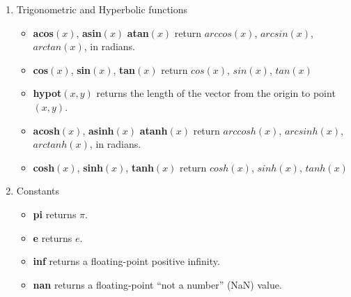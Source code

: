 \begin{enumerate}
\item Trigonometric and Hyperbolic functions
\begin{itemize}
\item \textbf{acos}$(x)$, \textbf{asin}$(x)$ \textbf{atan}$(x)$ return $arccos(x)$, $arcsin(x)$, $arctan(x)$, in radians.
\item \textbf{cos}$(x)$, \textbf{sin}$(x)$, \textbf{tan}$(x)$ return $cos(x)$, $sin(x)$, $tan(x)$
\item \textbf{hypot}$(x,y)$ returns the length of the vector from the origin to point $(x, y)$.
\item \textbf{acosh}$(x)$, \textbf{asinh}$(x)$ \textbf{atanh}$(x)$ return $arccosh(x)$, $arcsinh(x)$, $arctanh(x)$, in radians.
\item \textbf{cosh}$(x)$, \textbf{sinh}$(x)$, \textbf{tanh}$(x)$ return $cosh(x)$, $sinh(x)$, $tanh(x)$
\end{itemize}

\item Constants
\begin{itemize}
\item \textbf{pi} returns $\pi$.
\item \textbf{e} returns $e$.
\item \textbf{inf} returns a floating-point positive infinity.
\item \textbf{nan} returns a floating-point “not a number” (NaN) value.
\end{itemize}
\end{enumerate}